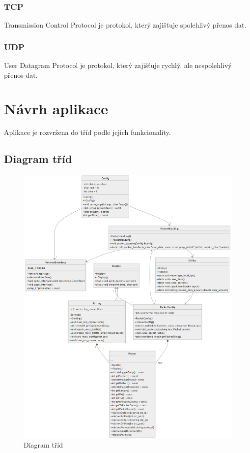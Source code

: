 \documentclass[a4paper, 11pt, hidelinks]{article}
\begin{document}
\subsubsection{TCP}
Transmission Control Protocol je protokol, který zajišťuje spolehlivý přenos dat. \cite{RFC793}

\subsubsection{UDP}
User Datagram Protocol je protokol, který zajišťuje rychlý, ale nespolehlivý přenos dat. \cite{RFC768}

\newpage
\section{Návrh aplikace}
Aplikace je rozvržena do tříd podle jejich funkcionality. 

\subsection*{Diagram tříd}
\begin{figure}[h!]
    \centering
    \includegraphics[width=0.85\linewidth]{class_diagram.png}
    \caption{Diagram tříd}
    \label{fig:class_diagram}
\end{figure}
\end{document}
